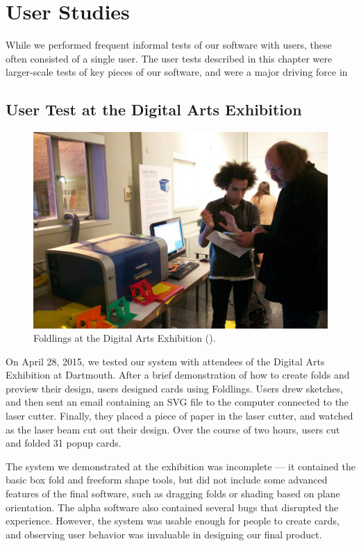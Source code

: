 \chapter{User Studies}

While we performed frequent informal tests of our software with users,
these often consisted of a single user. The user tests described in this
chapter were larger-scale tests of key pieces of our software, and were
a major driving force in

\section{User Test at the Digital Arts
Exhibition}\label{user-test-at-the-digital-arts-exhibition}

\begin{figure}[htbp]
\centering
\includegraphics{figures/50_User_Study_Dax/dax_facebook_credit_Julietta_Gervase}
\caption{Foldlings at the Digital Arts Exhibition (\citet{daxphoto}).}
\end{figure}

On April 28, 2015, we tested our system with attendees of the Digital
Arts Exhibition at Dartmouth. After a brief demonstration of how to
create folds and preview their design, users designed cards using
Foldlings. Users drew sketches, and then sent an email containing an SVG
file to the computer connected to the laser cutter. Finally, they placed
a piece of paper in the laser cutter, and watched as the laser beam cut
out their design. Over the course of two hours, users cut and folded 31
popup cards.

The system we demonstrated at the exhibition was incomplete --- it
contained the basic box fold and freeform shape tools, but did not
include some advanced features of the final software, such as dragging
folds or shading based on plane orientation. The alpha software also
contained several bugs that disrupted the experience. However, the
system was usable enough for people to create cards, and observing user
behavior was invaluable in designing our final product.

